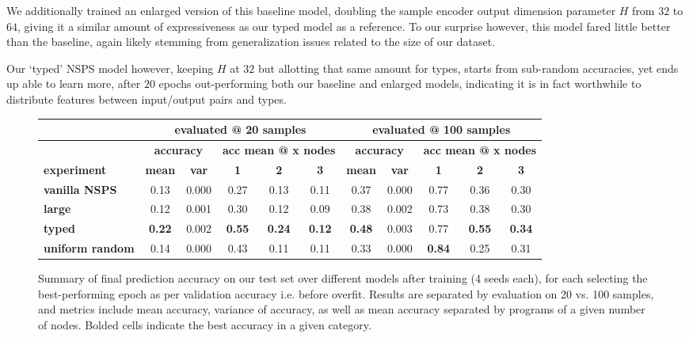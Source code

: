 \documentclass{article}
\begin{document}
We additionally trained an enlarged version of this baseline model,
doubling the sample encoder output dimension parameter $H$ from $32$ to $64$,
giving it a similar amount of expressiveness as our typed model as a reference.
To our surprise however, this model
fared little better than the baseline, again likely stemming
from generalization issues related to the size of our dataset.

Our `typed' NSPS model however,
keeping $H$ at $32$ but allotting that same amount for types,
starts from sub-random accuracies, yet ends up able to learn more,
after $20$ epochs out-performing both our baseline and enlarged models,
indicating it is in fact worthwhile to distribute features between input/output pairs and types.

\begin{figure}
    \begin{tabular}{|l|c|c|c|c|c|c|c|c|c|c|} \hline
        & \multicolumn{5}{|c|}{ \textbf{evaluated @ 20 samples} } & \multicolumn{5}{|c|}{ \textbf{evaluated @ 100 samples} } \\ \hline
        & \multicolumn{2}{|c|}{ \textbf{accuracy} } & \multicolumn{3}{|c|}{ \textbf{acc mean @ x nodes} } & \multicolumn{2}{|c|}{ \textbf{accuracy} } & \multicolumn{3}{|c|}{ \textbf{acc mean @ x nodes} } \\ \hline
        \textbf{experiment} & \textbf{mean} & \textbf{var} & \textbf{1} & \textbf{2} & \textbf{3} & \textbf{mean} & \textbf{var} & \textbf{1} & \textbf{2} & \textbf{3} \\ \hline
        \textbf{vanilla NSPS} & 0.13 & 0.000 & 0.27 & 0.13 & 0.11 & 0.37 & 0.000 & 0.77 & 0.36 & 0.30 \\ \hline
        \textbf{large} & 0.12 & 0.001 & 0.30 & 0.12 & 0.09 & 0.38 & 0.002 & 0.73 & 0.38 & 0.30 \\ \hline
        \textbf{typed} & \textbf{0.22} & 0.002 & \textbf{0.55} & \textbf{0.24} & \textbf{0.12} & \textbf{0.48} & 0.003 & 0.77 & \textbf{0.55} & \textbf{0.34} \\ \hline
        \textbf{uniform random} & 0.14 & 0.000 & 0.43 & 0.11 & 0.11 & 0.33 & 0.000 & \textbf{0.84} & 0.25 & 0.31 \\ \hline
    \end{tabular}
\caption{
    Summary of final prediction accuracy on our test set over different models after training (4 seeds each),
    for each selecting the best-performing epoch as per validation accuracy i.e. before overfit.
    Results are separated by evaluation on 20 vs. 100 samples,
    and metrics include mean accuracy, variance of accuracy,
    as well as mean accuracy separated by programs of a given number of nodes. Bolded cells indicate the best accuracy in a given category.
}
\label{fig:finalacc}
\end{figure}
\end{document}
